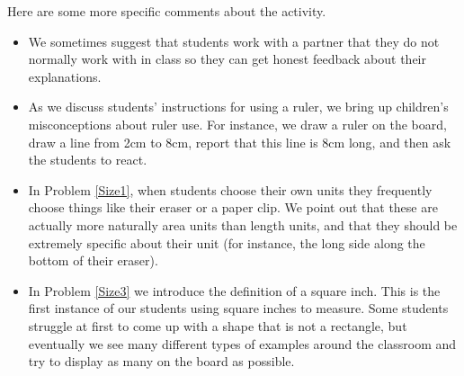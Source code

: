 \documentclass[handout]{ximera}
\begin{document}
\begin{instructorNotes}
Here are some more specific comments about the activity.
\begin{itemize}
    \item We sometimes suggest that students work with a partner that they do not normally work with in class so they can get honest feedback about their explanations.
    \item As we discuss students' instructions for using a ruler, we bring up children's misconceptions about ruler use.  For instance, we draw a ruler on the board, draw a line from 2cm to 8cm, report that this line is 8cm long, and then ask the students to react.
    \item In Problem \ref{Size1}, when students choose their own units they frequently choose things like their eraser or a paper clip.  We point out that these are actually more naturally area units than length units, and that they should be extremely specific about their unit (for instance, the long side along the bottom of their eraser).
    \item In Problem \ref{Size3} we introduce the definition of a square inch.  This is the first instance of our students using square inches to measure.  Some students struggle at first to come up with a shape that is not a rectangle, but eventually we see many different types of examples around the classroom and try to display as many on the board as possible.
\end{itemize}








\end{instructorNotes}
\end{document}
